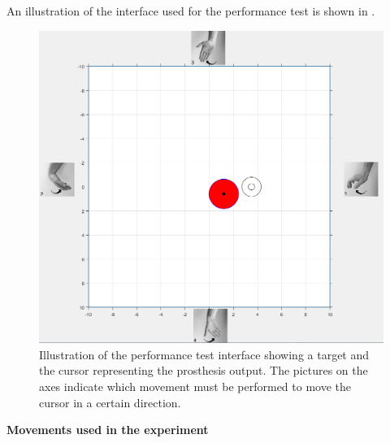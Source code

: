 An illustration of the interface used for the performance test is shown in .

\begin{figure}[H]                 
	\includegraphics[width=.8\textwidth]{figures/xBackground/perftestGUI}  
	\caption{Illustration of the performance test interface showing a target and the cursor representing the prosthesis output. The pictures on the axes indicate which movement must be performed to move the cursor in a certain direction.}
	\label{fig:perftestGUI} 
\end{figure}

\newpage
\textbf{\Large Movements used in the experiment}

